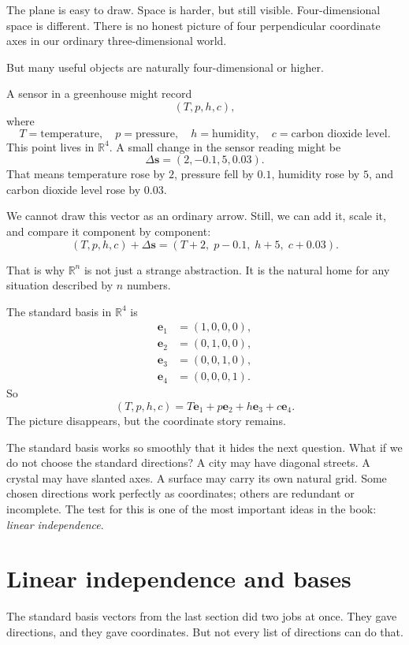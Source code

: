 The plane is easy to draw.  Space is harder, but still visible.  Four-dimensional space
is different.  There is no honest picture of four perpendicular coordinate axes in our
ordinary three-dimensional world.

But many useful objects are naturally four-dimensional or higher.

A sensor in a greenhouse might record
\[
    (T,p,h,c),
\]
where
\[
    T=\text{temperature},\quad
    p=\text{pressure},\quad
    h=\text{humidity},\quad
    c=\text{carbon dioxide level}.
\]
This point lives in \(\mathbb R^4\).  A small change in the sensor reading might be
\[
    \Delta \mathbf s=(2,-0.1,5,0.03).
\]
That means temperature rose by \(2\), pressure fell by \(0.1\), humidity rose by \(5\),
and carbon dioxide level rose by \(0.03\).

We cannot draw this vector as an ordinary arrow.  Still, we can add it, scale it, and
compare it component by component:
\[
    (T,p,h,c)+\Delta \mathbf s
    =
    (T+2,\;p-0.1,\;h+5,\;c+0.03).
\]

That is why \(\mathbb R^n\) is not just a strange abstraction.  It is the natural home
for any situation described by \(n\) numbers.

The standard basis in \(\mathbb R^4\) is
\[
\begin{aligned}
    \mathbf e_1&=(1,0,0,0),\\
    \mathbf e_2&=(0,1,0,0),\\
    \mathbf e_3&=(0,0,1,0),\\
    \mathbf e_4&=(0,0,0,1).
\end{aligned}
\]
So
\[
    (T,p,h,c)
    =
    T\mathbf e_1+p\mathbf e_2+h\mathbf e_3+c\mathbf e_4.
\]
The picture disappears, but the coordinate story remains.

The standard basis works so smoothly that it hides the next question.  What if we do
not choose the standard directions?  A city may have diagonal streets.  A crystal may
have slanted axes.  A surface may carry its own natural grid.  Some chosen directions
work perfectly as coordinates; others are redundant or incomplete.  The test for this is
one of the most important ideas in the book: \emph{linear independence}.

\section{Linear independence and bases}

The standard basis vectors from the last section did two jobs at once.  They gave
directions, and they gave coordinates.  But not every list of directions can do that.

